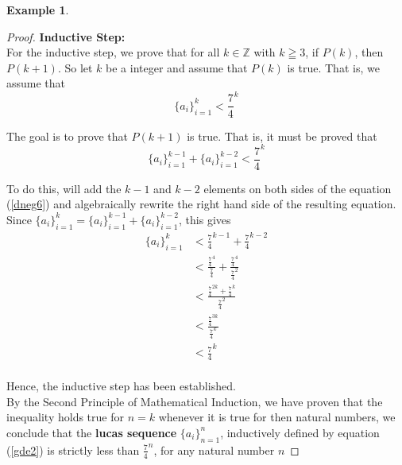 \documentclass{book}
\theoremstyle{definition}
\newtheorem{example}{Example}[definition]
\theoremstyle{remark}
\newcommand{\bb}[1]{\mathbb{#1}}
\begin{document}
\begin{example}
\begin{proof}
        \textbf{Inductive Step:} \\
            For the inductive step, we prove that for all $k \in \bb{Z}$ with $k \geqq 3$, if $P(k)$, then $P(k+1)$. So let $k$ be a integer and assume that $P(k)$ is true. That is, we assume that 
                \begin{equation*}
                   \{a_i\}_{i=1}^{k}  <  \frac{7}{4}^{k}
                \end{equation*}
            
            The goal is to prove that $P(k+1)$ is true. That is, it must be proved that  
                \begin{equation}
                \label{dneg6}
                     \{a_i\}_{i=1}^{k-1} + \{a_i\}_{i=1}^{k-2} < \frac{7}{4}^{k}
                \end{equation}
            
            To do this, will add the $k-1$ and $k-2$ elements on both sides of the equation (\ref{dneg6}) and algebraically rewrite the right hand side of the resulting equation. Since $\{a_i\}_{i=1}^{k} = \{a_i\}_{i=1}^{k-1} + \{a_i\}_{i=1}^{k-2}$, this gives
                \begin{align*}
                    \{a_i\}_{i=1}^{k} & < \frac{7}{4}^{k-1} + \frac{7}{4}^{k-2} \\
                        & < \frac{{\frac{7}{4}}^4}{\frac{7}{4}} + \frac{{\frac{7}{4}}^4}{{\frac{7}{4}}^2} \\
                        & < \frac{{\frac{7}{4}}^{2k} + {\frac{7}{4}}^k}{{\frac{7}{4}}^2} \\
                        & < \frac{{\frac{7}{4}}^{3k}}{{\frac{7}{4}}^k} \\
                        & < {\frac{7}{4}}^k \\
                \end{align*}
            
            Hence, the inductive step has been established. \\
            
        By the Second Principle of Mathematical Induction, we have proven that the inequality holds true for $n=k$ whenever it is true for then natural numbers, we conclude that the \textbf{lucas sequence} $\{a_i\}_{n=1}^{n}$, inductively defined by equation (\ref{gde2}) is strictly less than $\frac{7}{4}^n$, for any natural number $n$
\end{proof}
\end{example}
\end{document}
